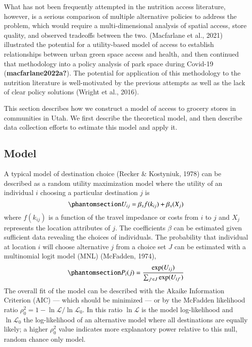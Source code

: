 \documentclass[
  letterpaper,
  number,
  review,
  3p]{elsarticle}
\begin{document}
What has not been frequently attempted in the nutrition access
literature, however, is a serious comparison of multiple alternative
policies to address the problem, which would require a multi-dimensional
analysis of spatial access, store quality, and observed tradeoffs
between the two. (Macfarlane et al., 2021) illustrated the potential for
a utility-based model of access to establish relationships between urban
green space access and health, and then continued that methodology into
a policy analysis of park space during Covid-19
(\textbf{macfarlane2022a?}). The potential for application of this
methodology to the nutrition literature is well-motivated by the
previous attempts as well as the lack of clear policy solutions (Wright
et al., 2016).

This section describes how we construct a model of access to grocery
stores in communities in Utah. We first describe the theoretical model,
and then describe data collection efforts to estimate this model and
apply it.

\subsection{Model}\label{model}

A typical model of destination choice (Recker \& Kostyniuk, 1978) can be
described as a random utility maximization model where the utility of an
individual \(i\) choosing a particular destination \(j\) is
\begin{equation}\phantomsection\label{eq-utility}{ U_{ij} = \beta_{s}f(k_{ij}) + \beta_{x}(X_j) }\end{equation}
where \(f(k_{ij})\) is a function of the travel impedance or costs from
\(i\) to \(j\) and \(X_{j}\) represents the location attributes of
\(j\). The coefficients \(\beta\) can be estimated given sufficient data
revealing the choices of individuals. The probability that individual at
location \(i\) will choose alternative \(j\) from a choice set \(J\) can
be estimated with a multinomial logit model (MNL) (McFadden, 1974),
\begin{equation}\phantomsection\label{eq-mnl}{ P_i(j) = \frac{\exp(U_{ij})}{\sum_{j' \in J}{\exp(U_{ij'})}}}\end{equation}
The overall fit of the model can be described with the Akaike
Information Criterion (AIC) --- which should be minimized --- or by the
McFadden likelihood ratio
\(\rho^2_0 = 1 - \ln\mathcal{L} / \ln\mathcal{L}_0\). In this ratio
\(\ln{\mathcal{L}}\) is the model log-likelihood and
\(\ln{\mathcal{L}_0}\) the log-likelihood of an alternative model where
all destinations are equally likely; a higher \(\rho^2_0\) value
indicates more explanatory power relative to this null, random chance
only model.
\end{document}
